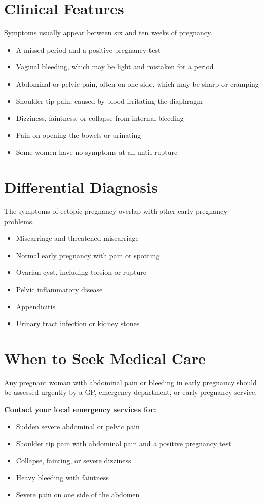 \section*{Clinical Features}
Symptoms usually appear between six and ten weeks of pregnancy.
\begin{itemize}
    \item A missed period and a positive pregnancy test
    \item Vaginal bleeding, which may be light and mistaken for a period
    \item Abdominal or pelvic pain, often on one side, which may be sharp or cramping
    \item Shoulder tip pain, caused by blood irritating the diaphragm
    \item Dizziness, faintness, or collapse from internal bleeding
    \item Pain on opening the bowels or urinating
    \item Some women have no symptoms at all until rupture
\end{itemize}

\section*{Differential Diagnosis}
The symptoms of ectopic pregnancy overlap with other early pregnancy problems.
\begin{itemize}
    \item Miscarriage and threatened miscarriage
    \item Normal early pregnancy with pain or spotting
    \item Ovarian cyst, including torsion or rupture
    \item Pelvic inflammatory disease
    \item Appendicitis
    \item Urinary tract infection or kidney stones
\end{itemize}

\section*{When to Seek Medical Care}
Any pregnant woman with abdominal pain or bleeding in early pregnancy should be assessed urgently by a GP, emergency department, or early pregnancy service.

\textbf{Contact your local emergency services for:}
\begin{itemize}
    \item Sudden severe abdominal or pelvic pain
    \item Shoulder tip pain with abdominal pain and a positive pregnancy test
    \item Collapse, fainting, or severe dizziness
    \item Heavy bleeding with faintness
    \item Severe pain on one side of the abdomen
\end{itemize}

